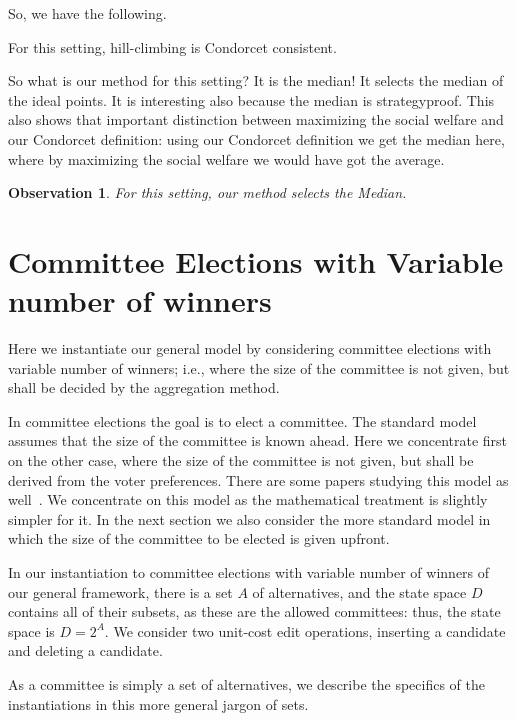 \documentclass{llncs}
\newtheorem{observation}{Observation}
\begin{document}
So, we have the following.

\begin{corollary}
  For this setting, hill-climbing is Condorcet consistent.
\end{corollary}

So what is our method for this setting? It is the median! It selects the median of the ideal points.
It is interesting also because the median is strategyproof.
This also shows that important distinction between maximizing the social welfare and our Condorcet definition:
  using our Condorcet definition we get the median here, where by maximizing the social welfare we would have got the average.

\begin{observation}
  For this setting, our method selects the Median.
\end{observation}


\section{Committee Elections with Variable number of winners}
\label{section:commiteee election}

Here we instantiate our general model by considering committee elections with variable number of winners; i.e., where the size of the committee is not given, but shall be decided by the aggregation method.

In committee elections the goal is to elect a committee. The standard model assumes that the size of the committee is known ahead.
Here we concentrate first on the other case, where the size of the committee is not given, but shall be derived from the voter preferences. There are some papers studying this model as well~\cite{kilgourvnw,vnw}.
We concentrate on this model as the mathematical treatment is slightly simpler for it. In the next section we also consider the more standard model in which the size of the committee to be elected is given upfront.

In our instantiation to committee elections with variable number of winners of our general framework, there is a set $A$ of alternatives, and the state space $D$ contains all of their subsets, as these are the allowed committees:
  thus, the state space is $D = 2^A$.
We consider two unit-cost edit operations, inserting a candidate and deleting a candidate.

As a committee is simply a set of alternatives, we describe the specifics of the instantiations in this more general jargon of sets.
\end{document}
